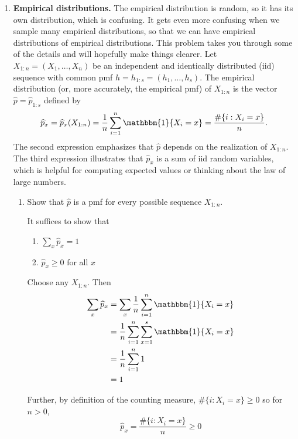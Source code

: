 \documentclass[12pt]{article}
\renewcommand{\hat}[1]{\widehat{#1}}
\newcommand{\ind}{\mathbbm{1}}
\begin{document}
\begin{enumerate}[1.]
	      \pagebreak
	\item {\bf Empirical distributions.} The empirical distribution is random, so it has its own distribution, which is confusing. It gets even more confusing when we sample many empirical distributions, so that we can have empirical distributions of empirical distributions. This problem takes you through some of the details and will hopefully make things clearer. Let $X_{1:n}=(X_1,\dotsc,X_n)$ be an independent and identically distributed (iid) sequence with common pmf $h=h_{1:s}=(h_1,\dotsc,h_s)$. The empirical distribution (or, more accurately, the empirical pmf) of $X_{1:n}$ is the vector $\widehat p=\widehat p_{1:s}$ defined by
	      \[ \widehat p_x = \widehat p_x(X_{1:n}) = \frac{1}{n}\sum_{i=1}^n \ind\{X_i=x\} = \frac{\#\{i:X_i=x\}}{n} . \]
	      The second expression emphasizes that $\widehat p$ depends on the realization of $X_{1:n}$. The third expression illustrates that $\widehat p_x$ is a sum of iid random variables, which is helpful for computing expected values or thinking about the law of large numbers.
	      \begin{enumerate}
		      \item Show that $\widehat p$ is a pmf for every possible sequence $X_{1:n}$.

		            \color{blue}
		            It suffices to show that
		            \begin{enumerate}
			            \item $\sum_x \hat p_x = 1$
			            \item $\hat p_x \geq 0$ for all $x$
		            \end{enumerate}

		            Choose any $X_{1:n}$. Then
		            \begin{align*}
			            \sum_x \hat p_x & = \sum_x \frac{1}{n} \sum_{i=1}^n \ind\{X_i = x\}       \\
			                            & = \frac{1}{n} \sum_{i=1}^n \sum_{x=1}^s \ind\{X_i = x\} \\
			                            & = \frac{1}{n} \sum_{i=1}^n 1                            \\
			                            & = 1
		            \end{align*}

		            Further, by definition of the counting measure, $\#\{i: X_i = x\} \geq 0$ so for $n > 0$,
		            \[\hat p_x = \frac{\#\{i: X_i = x\}}{n} \geq 0\]


\end{enumerate}
\end{enumerate}
\end{document}
